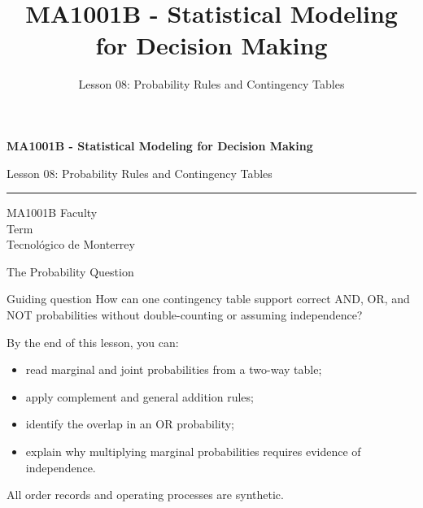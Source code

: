 \documentclass[aspectratio=169,10pt,english]{beamer}
\title{MA1001B - Statistical Modeling for Decision Making}
\subtitle{Lesson 08: Probability Rules and Contingency Tables}
\author{}
\institute{Tecnol\'ogico de Monterrey}
\date{}
\begin{document}
\begin{frame}[plain]
  \vspace{1.2cm}
  {\Large\bfseries MA1001B - Statistical Modeling for Decision Making\par}
  \vspace{0.7cm}
  {\large Lesson 08: Probability Rules and Contingency Tables\par}
  \vspace{0.7cm}
  {\color{TecRojo}\rule{\textwidth}{1.2pt}}
  \vspace{0.8cm}

  MA1001B Faculty\\[0.3cm]
  Term\\[0.3cm]
  Tecnol\'ogico de Monterrey
\end{frame}

\begin{frame}{The Probability Question}
  \begin{alertblock}{Guiding question}
    How can one contingency table support correct AND, OR, and NOT
    probabilities without double-counting or assuming independence?
  \end{alertblock}

  \vspace{0.4em}
  By the end of this lesson, you can:
  \begin{itemize}
    \item read marginal and joint probabilities from a two-way table;
    \item apply complement and general addition rules;
    \item identify the overlap in an OR probability;
    \item explain why multiplying marginal probabilities requires evidence of
      independence.
  \end{itemize}

  \vfill
  \scriptsize All order records and operating processes are synthetic.
\end{frame}
\end{document}
